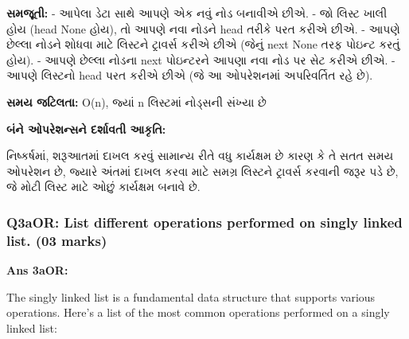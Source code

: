 \textbf{સમજૂતી:} - આપેલા ડેટા સાથે આપણે એક નવું નોડ બનાવીએ છીએ. - જો લિસ્ટ ખાલી
હોય (head None હોય), તો આપણે નવા નોડને head તરીકે પરત કરીએ છીએ. - આપણે છેલ્લા
નોડને શોધવા માટે લિસ્ટને ટ્રાવર્સ કરીએ છીએ (જેનું next None તરફ પોઇન્ટ કરતું હોય). -
આપણે છેલ્લા નોડના next પોઇન્ટરને આપણા નવા નોડ પર સેટ કરીએ છીએ. - આપણે લિસ્ટનો
head પરત કરીએ છીએ (જે આ ઓપરેશનમાં અપરિવર્તિત રહે છે).

\textbf{સમય જટિલતા:} O(n), જ્યાં n લિસ્ટમાં નોડ્સની સંખ્યા છે

\textbf{બંને ઓપરેશન્સને દર્શાવતી આકૃતિ:}

\begin{Shaded}
\begin{Highlighting}[]

\end{Highlighting}
\end{Shaded}

નિષ્કર્ષમાં, શરૂઆતમાં દાખલ કરવું સામાન્ય રીતે વધુ કાર્યક્ષમ છે કારણ કે તે સતત સમય ઓપરેશન
છે, જ્યારે અંતમાં દાખલ કરવા માટે સમગ્ર લિસ્ટને ટ્રાવર્સ કરવાની જરૂર પડે છે, જે મોટી
લિસ્ટ માટે ઓછું કાર્યક્ષમ બનાવે છે.

\hypertarget{q3aor-list-different-operations-performed-on-singly-linked-list.-03-marks}{%
\subsubsection{Q3aOR: List different operations performed on singly
linked list. (03
marks)}\label{q3aor-list-different-operations-performed-on-singly-linked-list.-03-marks}}

\textbf{Ans 3aOR:}

The singly linked list is a fundamental data structure that supports
various operations. Here's a list of the most common operations
performed on a singly linked list:

